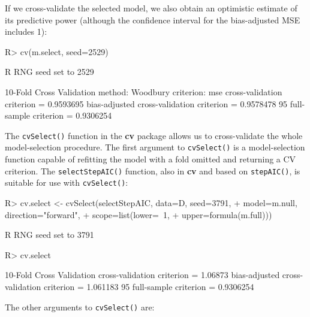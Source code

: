 \documentclass[
]{jss}
\begin{document}
If we cross-validate the selected model, we also obtain an optimistic
estimate of its predictive power (although the confidence interval for
the bias-adjusted MSE includes 1):

\begin{CodeChunk}
\begin{CodeInput}
R> cv(m.select, seed=2529)
\end{CodeInput}
\begin{CodeOutput}
R RNG seed set to 2529
\end{CodeOutput}
\begin{CodeOutput}
10-Fold Cross Validation
method: Woodbury
criterion: mse
cross-validation criterion = 0.9593695
bias-adjusted cross-validation criterion = 0.9578478
95%
full-sample criterion = 0.9306254 
\end{CodeOutput}
\end{CodeChunk}

The \texttt{cvSelect()} function in the \textbf{cv} package allows us to
cross-validate the whole model-selection procedure. The first argument
to \texttt{cvSelect()} is a model-selection function capable of
refitting the model with a fold omitted and returning a CV criterion.
The \texttt{selectStepAIC()} function, also in \textbf{cv} and based on
\texttt{stepAIC()}, is suitable for use with \texttt{cvSelect()}:

\begin{CodeChunk}
\begin{CodeInput}
R> cv.select <- cvSelect(selectStepAIC, data=D, seed=3791,
+                       model=m.null, direction="forward",
+                       scope=list(lower=~1, 
+                                  upper=formula(m.full)))
\end{CodeInput}
\begin{CodeOutput}
R RNG seed set to 3791
\end{CodeOutput}
\begin{CodeInput}
R> cv.select
\end{CodeInput}
\begin{CodeOutput}
10-Fold Cross Validation
cross-validation criterion = 1.06873
bias-adjusted cross-validation criterion = 1.061183
95%
full-sample criterion = 0.9306254 
\end{CodeOutput}
\end{CodeChunk}

The other arguments to \texttt{cvSelect()} are:
\end{document}
